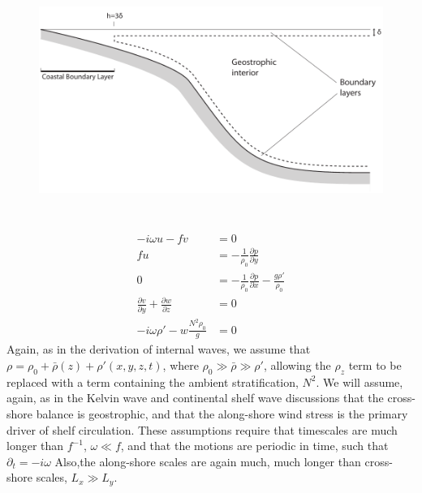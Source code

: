 \documentclass[11pt]{report}
\numberwithin{equation}{section}
\begin{document}
\begin{figure}[t]
    \centering
        \includegraphics[height=3in]{shelf_cross-section.pdf}
    \caption{}
    \label{fig:shelf_cross-section}
\end{figure}

\begin{align}
    - i \omega u - fv &= 0 \label{eq:csw_xmoment}\\
    fu &= -\frac{1}{\rho_0}\frac{\partial p}{\partial y} \label{eq:csw_ymoment}\\
    0 &= -\frac{1}{\rho_0}\frac{\partial p}{\partial x} - \frac{g \rho'}{\rho_0} \label{eq:csw_hydrostatic}\\
    \frac{\partial v}{\partial y} + \frac{\partial w}{\partial z} &= 0 \label{eq:csw_continuity}\\
    -i \omega \rho' - w\frac{N^2 \rho_0}{g} &= 0 \label{eq:csw_density}
\end{align}
Again, as in the derivation of internal waves, we assume that $\rho = \rho_0 + \bar{\rho}(z) + \rho'(x, y, z, t)$, where $\rho_0 \gg \bar{\rho} \gg \rho'$, allowing the $\rho_z$ term to be replaced with a term containing the ambient stratification, $N^2$.  We will assume, again, as in the Kelvin wave and continental shelf wave discussions that the cross-shore balance is geostrophic, and that the along-shore wind stress is the primary driver of shelf circulation.  These assumptions require that timescales are much longer than $f^{-1}$, $\omega \ll f$, and that the motions are periodic in time, such that $\partial_t = -i \omega$ Also,the along-shore scales are again much, much longer than cross-shore scales, $L_x \gg L_y$.
\end{document}
